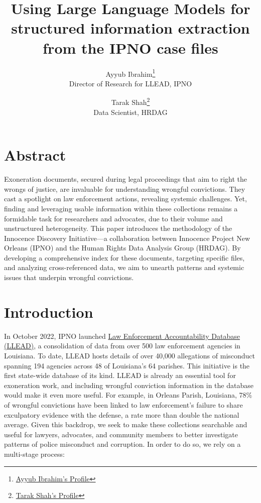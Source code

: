 \documentclass{article}
\title{Using Large Language Models for structured information extraction from the IPNO case files}
\author{
    Ayyub Ibrahim\footnote{\href{https://ip-no.org/who-we-are/staff/}{Ayyub Ibrahim's Profile}} \\
    Director of Research for LLEAD, IPNO
    \and
    Tarak Shah\footnote{\href{https://hrdag.org/people/tarak-shah/}{Tarak Shah's Profile}} \\
    Data Scientist, HRDAG
}
\begin{document}
\maketitle

\section*{Abstract}
Exoneration documents, secured during legal proceedings that aim to right the wrongs of justice, are invaluable for understanding wrongful convictions. They cast a spotlight on law enforcement actions, revealing systemic challenges. Yet, finding and leveraging usable information within these collections remains a formidable task for researchers and advocates, due to their volume and unstructured heterogeneity. This paper introduces the methodology of the Innocence Discovery Initiative—a collaboration between Innocence Project New Orleans (IPNO) and the Human Rights Data Analysis Group (HRDAG). By developing a comprehensive index for these documents, targeting specific files, and analyzing cross-referenced data, we aim to unearth patterns and systemic issues that underpin wrongful convictions.

\section{Introduction}

In October 2022, IPNO launched \href{https://llead.co/}{Law Enforcement Accountability Database (LLEAD)}, a consolidation of data from over 500 law enforcement agencies in Louisiana. To date, LLEAD hosts details of over 40,000 allegations of misconduct spanning 194 agencies across 48 of Louisiana's 64 parishes. This initiative is the first state-wide database of its kind. LLEAD is already an essential tool for exoneration work, and including wrongful conviction information in the database would make it even more useful. For example, in Orleans Parish, Louisiana, 78\% of wrongful convictions have been linked to law enforcement's failure to share exculpatory evidence with the defense, a rate more than double the national average. Given this backdrop, we seek to make these collections searchable and useful for lawyers, advocates, and community members to better investigate patterns of police misconduct and corruption. In order to do so, we rely on a multi-stage process:
\end{document}
